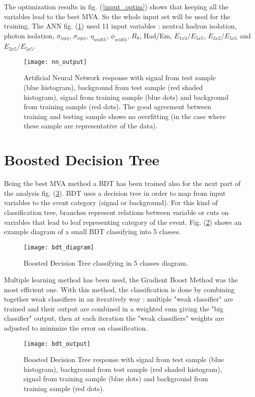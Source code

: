 The optimization results in fig. (\ref{input_optim}) shows that keeping all the variables lead to the best MVA. So the whole input set will be used for the training. The ANN fig. (\ref{nn_output}) used 11 input variables : neutral hadron isolation, photon isolation, $\sigma_{i \eta i \eta}$, $\sigma_{i \eta i \phi}$, $\eta_{width}$, $\phi_{width}$, $R_9$, Had/Em, $E_{1x3}/E_{5x5}$, $E_{2x2}/E_{5x5}$ and $E_{2x5}/E_{5x5}$.
 
\begin{figure}[h!]
\centering
    \texttt{[image: nn\_output]}
    \caption{Artificial Neural Network response with signal from test sample (blue histogram), background from test
    sample (red shaded histogram), signal from training sample (blue dots) and background from training sample (red
    dots). The good agreement between training and testing sample shows no overfitting (in the case where these sample
    are representative of the data).}
    \label{nn_output}
\end{figure}

\section{Boosted Decision Tree}

Being the best MVA method a BDT has been trained also for the next part of the analysis fig. (\ref{bdt_output}).
BDT uses a decision tree in order to map from input variables to the event category (signal or background).
For this kind of classification tree, branches represent relations between variable or cuts on variables that lead to
leaf representing category of the event. Fig. (\ref{bdt_diagram}) shows an example diagram of a small BDT classifying
into 5 classes.\\
\begin{figure}[h!]
\centering
    \texttt{[image: bdt\_diagram]}
    \caption{Boosted Decision Tree classifying in 5 classes diagram.}
    \label{bdt_diagram}
\end{figure}


Multiple learning method has been used, the Gradient Boost Method was the most efficient one.
With this method, the classification is done by combining together weak classifiers in an iteratively way :
multiple "weak classifier" are trained and their output are combined in a weighted sum giving the "big classifier"
output, then at each iteration the "weak classifiers" weights are adjusted to minimize the error on classification.

\begin{figure}[h!]
\centering
    \texttt{[image: bdt\_output]}
    \caption{Boosted Decision Tree response with signal from test sample (blue histogram),
    background from test sample (red shaded histogram), signal from training sample (blue dots)
    and background from training sample (red dots).}
    \label{bdt_output}
\end{figure}




